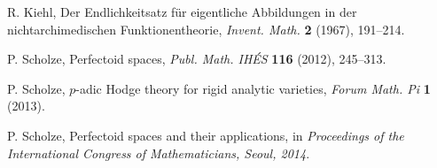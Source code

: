 \documentclass[12pt]{amsart}
\theoremstyle{definition}
\numberwithin{equation}{theorem}
\begin{document}
\begin{thebibliography}{99}
R. Kiehl, Der Endlichkeitsatz f\"ur eigentliche Abbildungen
in der nichtarchimedischen Funktionentheorie,
\textit{Invent. Math.} \textbf{2} (1967), 191--214.

P. Scholze, Perfectoid spaces, \textit{Publ. Math. IH\'ES} \textbf{116} (2012), 245--313.

P. Scholze, $p$-adic Hodge theory for rigid analytic varieties, \textit{Forum Math. Pi} \textbf{1} (2013).

P. Scholze, Perfectoid spaces and their applications, in \textit{Proceedings of the
International Congress of Mathematicians, Seoul, 2014}.

\end{thebibliography}
\end{document}

